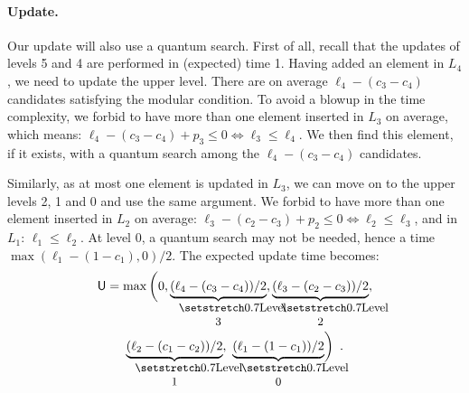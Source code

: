 \paragraph{Update.} Our update will also use a quantum search. First of all, recall that the updates of levels 5 and 4 are performed in (expected) time 1. Having added an element in $L_4$, we need to update the upper level. There are on average $\ell_4 - (c_3 - c_4)$ candidates satisfying the modular condition. To avoid a blowup in the time complexity, we forbid to have more than one element inserted in $L_3$ on average, which means: $\ell_4 - (c_3 - c_4) + p_3 \leq 0 \iff \ell_3 \leq \ell_4$. We then find this element, if it exists, with a quantum search among the $\ell_4 - (c_3 - c_4)$ candidates. %

Similarly, as at most one element is updated in $L_3$, we can move on to the upper levels 2, 1 and 0 and use the same argument. We forbid to have more than one element inserted in $L_2$ on average: $\ell_3 - (c_2 - c_3) + p_2 \leq 0 \iff \ell_2 \leq \ell_3$, and in $L_1$: $\ell_1 \leq \ell_2$. At level 0, a quantum search may not be needed, hence a time $\max(\ell_1 - (1 - c_1), 0) / 2$. The expected update time becomes:
\begin{multline*}
 \mathsf{U} =  \max \bigg( 0, \undertext{Level 3}{(\ell_4 - (c_3 - c_4))/2}, \undertext{Level 2}{(\ell_3 - (c_2 - c_3))/2},\\
\undertext{Level 1}{(\ell_2 - (c_1 - c_2))/2},~\undertext{Level 0}{(\ell_1 - (1-c_1))/2} \bigg) \enspace.
\end{multline*}






